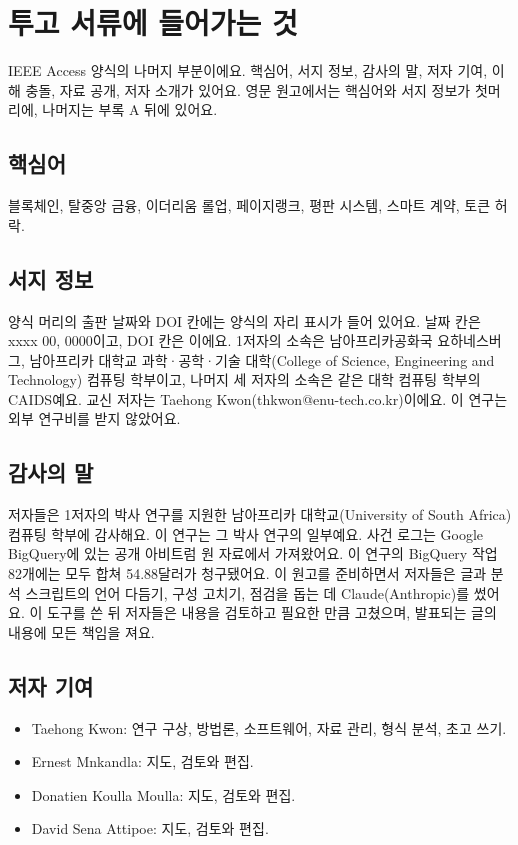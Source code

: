 \section*{투고 서류에 들어가는 것}

\begin{yoji}
IEEE Access 양식의 나머지 부분이에요. 핵심어, 서지 정보, 감사의 말, 저자 기여, 이해 충돌, 자료 공개, 저자 소개가 있어요. 영문 원고에서는 핵심어와 서지 정보가 첫머리에, 나머지는 부록 A 뒤에 있어요.
\end{yoji}

\subsection*{핵심어}
블록체인, 탈중앙 금융, 이더리움 롤업, 페이지랭크, 평판 시스템, 스마트 계약, 토큰 허락.

\subsection*{서지 정보}
양식 머리의 출판 날짜와 DOI 칸에는 양식의 자리 표시가 들어 있어요. 날짜 칸은 xxxx 00, 0000이고, DOI 칸은 이에요. 1저자의 소속은 남아프리카공화국 요하네스버그, 남아프리카 대학교 과학·공학·기술 대학(College of Science, Engineering and Technology) 컴퓨팅 학부이고, 나머지 세 저자의 소속은 같은 대학 컴퓨팅 학부의 CAIDS예요. 교신 저자는 Taehong Kwon(thkwon@enu-tech.co.kr)이에요. 이 연구는 외부 연구비를 받지 않았어요.

\subsection*{감사의 말}
저자들은 1저자의 박사 연구를 지원한 남아프리카 대학교(University of South Africa) 컴퓨팅 학부에 감사해요. 이 연구는 그 박사 연구의 일부예요. 사건 로그는 Google BigQuery에 있는 공개 아비트럼 원 자료에서 가져왔어요. 이 연구의 BigQuery 작업 82개에는 모두 합쳐 54.88달러가 청구됐어요. 이 원고를 준비하면서 저자들은 글과 분석 스크립트의 언어 다듬기, 구성 고치기, 점검을 돕는 데 Claude(Anthropic)를 썼어요. 이 도구를 쓴 뒤 저자들은 내용을 검토하고 필요한 만큼 고쳤으며, 발표되는 글의 내용에 모든 책임을 져요.

\subsection*{저자 기여}
\begin{itemize}
\item Taehong Kwon: 연구 구상, 방법론, 소프트웨어, 자료 관리, 형식 분석, 초고 쓰기.
\item Ernest Mnkandla: 지도, 검토와 편집.
\item Donatien Koulla Moulla: 지도, 검토와 편집.
\item David Sena Attipoe: 지도, 검토와 편집.
\end{itemize}

